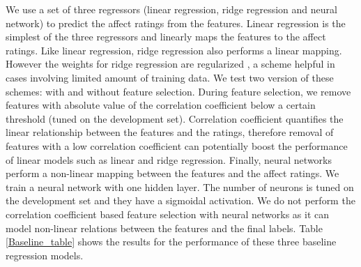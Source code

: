 \documentclass{article}
\begin{document}


We use a set of three regressors (linear regression, ridge regression and neural network) to predict the affect ratings from the features. 
Linear regression \cite{} is the simplest of the three regressors and linearly maps the features to the affect ratings.
Like linear regression, ridge regression \cite{} also performs a linear mapping.
However the weights for ridge regression are regularized \cite{}, a scheme helpful in cases involving limited amount of training data.
We test two version of these schemes: with and without feature selection.
During feature selection, we remove features with absolute value of the correlation coefficient below a certain threshold (tuned on the development set).
Correlation coefficient quantifies the linear relationship between the features and the ratings, therefore removal of features with a low correlation coefficient can potentially boost the performance of linear models such as linear and ridge regression. 
Finally, neural networks perform a non-linear mapping between the features and the affect ratings. 
We train a neural network with one hidden layer.
The number of neurons is tuned on the development set and they have a sigmoidal activation.
We do not perform the correlation coefficient based feature selection with neural networks as it can model non-linear relations between the features and the final labels. 
Table \ref{Baseline_table} shows the results for the performance of these three baseline regression models. 
\end{document}
